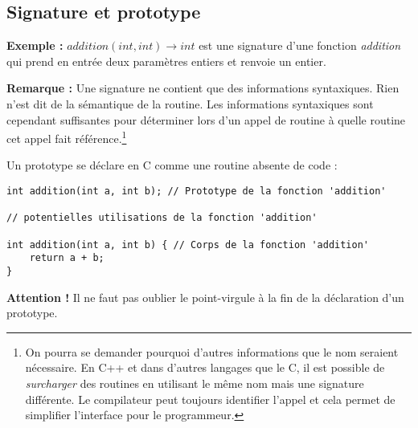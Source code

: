 \documentclass[../../../main.tex]{subfiles}
\begin{document}
\subsection{Signature et prototype}
\label{sub:signature_et_prototype}
\textbf{Exemple :} $addition(int, int) \rightarrow int$ est une signature d'une fonction \textit{addition} qui prend en entrée deux paramètres entiers et renvoie un entier.

\textbf{Remarque :} Une signature ne contient que des informations syntaxiques. Rien n'est dit de la sémantique de la routine. Les informations syntaxiques sont cependant suffisantes pour déterminer lors d'un appel de routine à quelle routine cet appel fait référence.\footnote{On pourra se demander pourquoi d'autres informations que le nom seraient nécessaire. En C++ et dans d'autres langages que le C, il est possible de \textit{surcharger} des routines en utilisant le même nom mais une signature différente. Le compilateur peut toujours identifier l'appel et cela permet de simplifier l'interface pour le programmeur.}

Un prototype se déclare en C comme une routine absente de code :
\begin{verbatim}
int addition(int a, int b); // Prototype de la fonction 'addition'

// potentielles utilisations de la fonction 'addition'

int addition(int a, int b) { // Corps de la fonction 'addition'
	return a + b;
}
\end{verbatim}
\textbf{Attention !} Il ne faut pas oublier le point-virgule à la fin de la déclaration d'un prototype.
\end{document}

